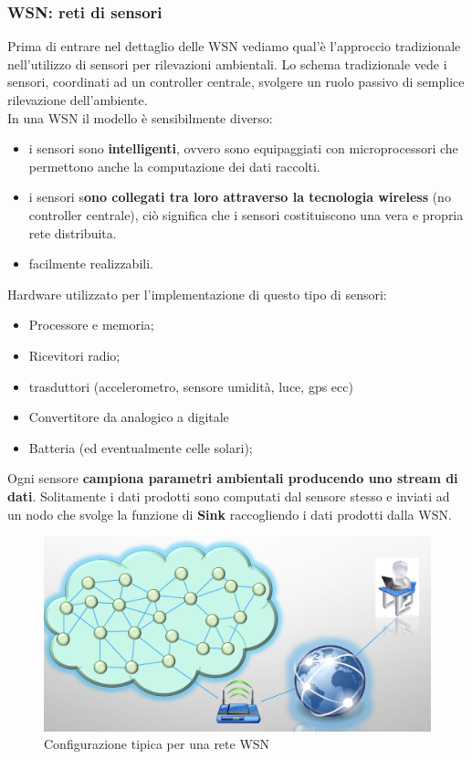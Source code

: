 \documentclass[12pt]{article}
\begin{document}
		\subsubsection{WSN: reti di sensori }  	
			Prima di entrare nel dettaglio delle WSN vediamo qual'è l'approccio tradizionale nell'utilizzo di sensori per rilevazioni ambientali. Lo schema tradizionale vede i sensori, coordinati ad un controller centrale, svolgere un ruolo passivo di semplice rilevazione dell'ambiente.\\
			In una WSN il modello è sensibilmente diverso:
			\begin{itemize}
				\item i sensori sono \textbf{intelligenti}, ovvero sono equipaggiati con microprocessori che permettono anche la computazione dei dati raccolti.
				\item i sensori s\textbf{ono collegati tra loro attraverso la tecnologia wireless} (no controller centrale), ciò significa che i sensori costituiscono una vera e propria rete distribuita.
				\item facilmente realizzabili.
			\end{itemize}
			Hardware utilizzato per l'implementazione di questo tipo di sensori:
			\begin{itemize}
				\item Processore e memoria;
				\item Ricevitori radio;
				\item trasduttori (accelerometro, sensore umidità, luce, gps ecc)
				\item Convertitore da analogico a digitale
				\item Batteria (ed eventualmente celle solari);
			\end{itemize}  
    		Ogni sensore \textbf{campiona parametri ambientali producendo uno stream di dati}. Solitamente i dati prodotti sono computati dal sensore stesso e inviati ad un nodo che svolge la funzione di \textbf{Sink} raccogliendo i dati prodotti dalla WSN.
    		\begin{figure}[h!]
    			\centering
    			\includegraphics[scale=0.3]{img/wsn.png}
    			\caption{Configurazione tipica per una rete WSN}
    		\end{figure}
\end{document}
